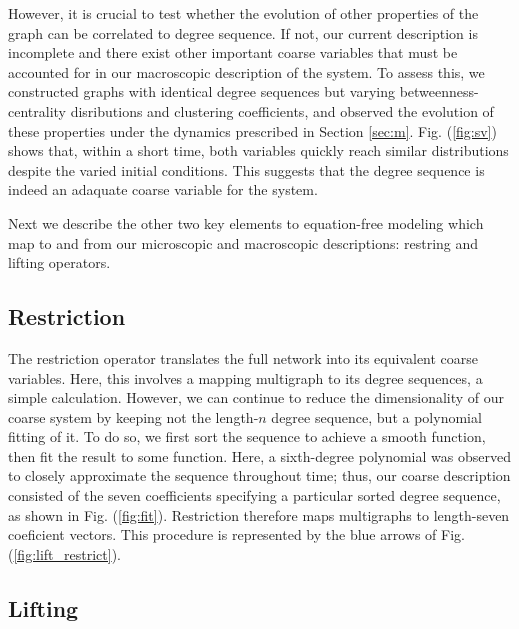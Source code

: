 \documentclass[12pt]{article}
\begin{document}
\begin{onehalfspace}
However, it is crucial to test whether the evolution of other properties of the graph can be correlated to degree sequence. If not, our current description is incomplete and there exist other  important coarse variables that must be accounted for in our macroscopic description of the system. To assess this, we constructed graphs with identical degree sequences but varying betweenness-centrality disributions and clustering coefficients, and observed the evolution of these properties under the dynamics prescribed in Section \ref{sec:m}. Fig. (\ref{fig:sv}) shows that, within a short time, both variables quickly reach similar distributions despite the varied initial conditions. This suggests that the degree sequence is indeed an adaquate coarse variable for the system. \par



Next we describe the other two key elements to equation-free modeling which map to and from our microscopic and macroscopic descriptions: restring and lifting operators.

\subsection{Restriction}

The restriction operator translates the full network into its equivalent coarse variables. Here, this involves a mapping multigraph to its degree sequences, a simple calculation. However, we can continue to reduce the dimensionality of our coarse system by keeping not the length-$n$ degree sequence, but a polynomial fitting of it. To do so, we first sort the sequence to achieve a smooth function, then fit the result to some function. Here, a sixth-degree polynomial was observed to closely approximate the sequence throughout time; thus, our coarse description consisted of the seven coefficients specifying a particular sorted degree sequence, as shown in Fig. (\ref{fig:fit}). Restriction therefore maps multigraphs to length-seven coeficient vectors. This procedure is represented by the blue arrows of Fig. (\ref{fig:lift_restrict}).

\subsection{Lifting}


\end{onehalfspace}
\end{document}
